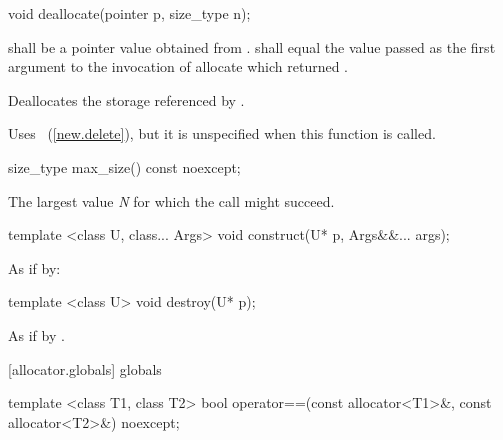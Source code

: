 \begin{itemdecl}
void deallocate(pointer p, size_type n);
\end{itemdecl}

\begin{itemdescr}
\pnum
\requires
{} shall be a pointer value obtained from .
 shall equal the value passed as the first argument
to the invocation of allocate which returned .

\pnum
\effects
Deallocates the storage referenced by  .

\pnum
\remarks
Uses
~(\ref{new.delete}), but it is unspecified
when this function is called.
\end{itemdescr}

\begin{itemdecl}
size_type max_size() const noexcept;
\end{itemdecl}

\begin{itemdescr}
\pnum
\returns
The largest value \textit{N} for which the call 
might succeed.
\end{itemdescr}

%
\begin{itemdecl}
template <class U, class... Args>
  void construct(U* p, Args&&... args);
\end{itemdecl}

\begin{itemdescr}
\pnum
\effects
As if by: 
\end{itemdescr}

%
\begin{itemdecl}
template <class U>
  void destroy(U* p);
\end{itemdecl}

\begin{itemdescr}
\pnum
\effects
As if by .
\end{itemdescr}

[allocator.globals]{ globals}

%
%
\begin{itemdecl}
template <class T1, class T2>
  bool operator==(const allocator<T1>&, const allocator<T2>&) noexcept;
\end{itemdecl}


